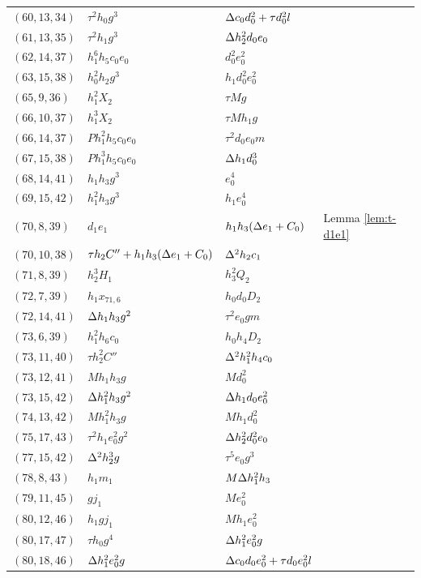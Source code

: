 \begin{longtable}{llll}
$(60, 13, 34)$ & $\tau^2 h_0 g^3$ & $\Delta c_0 d_0^2 + \tau d_0^2 l$ \\
$(61, 13, 35)$ & $\tau^2 h_1 g^3$ & $\Delta h_2^2 d_0 e_0$ \\
$(62, 14, 37)$ & $h_1^6 h_5 c_0 e_0$ & $d_0^2 e_0^2$ \\
$(63, 15, 38)$ & $h_0^2 h_2 g^3$ & $h_1 d_0^2 e_0^2$ \\
$(65, 9, 36)$ & $h_1^2 X_2$ & $\tau M g$ \\
$(66, 10, 37)$ & $h_1^3 X_2$ & $\tau M h_1 g$ \\
$(66, 14, 37)$ & $P h_1^2 h_5 c_0 e_0$ & $\tau^2 d_0 e_0 m$ \\
$(67, 15, 38)$ & $P h_1^3 h_5 c_0 e_0$ & $\Delta h_1 d_0^3$ \\
$(68, 14, 41)$ & $h_1 h_3 g^3$ & $e_0^4$ \\
$(69, 15, 42)$ & $h_1^2 h_3 g^3$ & $h_1 e_0^4$ \\
$(70, 8, 39)$ & $d_1 e_1$ & $h_1 h_3 (\Delta e_1 + C_0)$ & 
	Lemma \ref{lem:t-d1e1} \\
$(70, 10, 38)$ & $\tau h_2 C'' + h_1 h_3 (\Delta e_1 + C_0)$ & $\Delta^2 h_2 c_1$ \\
$(71, 8, 39)$ & $h_2^3 H_1$ & $h_3^2 Q_2$ \\
$(72, 7, 39)$ & $h_1 x_{71,6}$ & $h_0 d_0 D_2$ \\
$(72, 14, 41)$ & $\Delta h_1 h_3 g^2$ & $\tau^2 e_0 g m$ \\
$(73, 6, 39)$ & $h_1^2 h_6 c_0$ & $h_0 h_4 D_2$ \\
$(73, 11, 40)$ & $\tau h_2^2 C''$ & $\Delta^2 h_1^2 h_4 c_0$ \\
$(73, 12, 41)$ & $M h_1 h_3 g$ & $M d_0^2$ \\
$(73, 15, 42)$ & $\Delta h_1^2 h_3 g^2$ & $\Delta h_1 d_0 e_0^2$ \\
$(74, 13, 42)$ & $M h_1^2 h_3 g$ & $M h_1 d_0^2$ \\
$(75, 17, 43)$ & $\tau^2 h_1 e_0^2 g^2$ & $\Delta h_2^2 d_0^2 e_0$ \\
$(77, 15, 42)$ & $\Delta^2 h_2^3 g$ & $\tau^5 e_0 g^3$ \\
$(78, 8, 43)$ & $h_1 m_1$ & $M \Delta h_1^2 h_3$ \\
$(79, 11, 45)$ & $g j_1$ & $M e_0^2$ \\
$(80, 12, 46)$ & $h_1 g j_1$ & $M h_1 e_0^2$ \\
$(80, 17, 47)$ & $\tau h_0 g^4$ & $\Delta h_1^2 e_0^2 g$ \\
$(80, 18, 46)$ & $\Delta h_1^2 e_0^2 g$ & 
	$\Delta c_0 d_0 e_0^2 + \tau d_0 e_0^2 l$ \\

\end{longtable}
